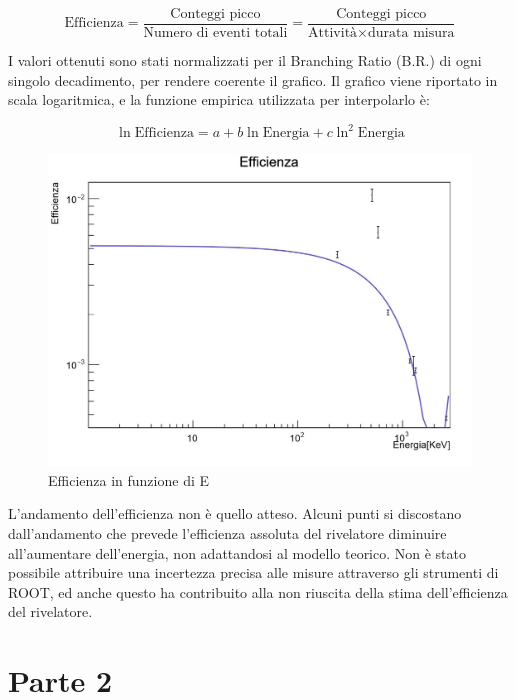 \documentclass[a4paper,10pt]{article}
\begin{document}
\begin{equation}
	\textrm{Efficienza}=\frac{\textrm{Conteggi picco}}{\textrm{Numero di eventi totali}}=\frac{\textrm{Conteggi picco}}{\textrm{Attivit\`a} \times \textrm{durata misura}}
\end{equation}

\noindent I valori ottenuti sono stati normalizzati per il Branching Ratio (B.R.) di ogni singolo decadimento, per rendere coerente il grafico. Il grafico viene riportato in scala logaritmica, e la funzione empirica utilizzata per interpolarlo \`e:

\begin{equation}
	\ln{\textrm{Efficienza}}=a + b\ln{\textrm{Energia}} + c\ln^{2}{\textrm{Energia}}
\end{equation}

\begin{figure}[H]
    \centering
    \includegraphics[scale=0.45]{grafici/efficienzasources}
    \caption{Efficienza in funzione di E}
\end{figure}

\noindent L'andamento dell'efficienza non \`e quello atteso. Alcuni punti si discostano dall'andamento che prevede l'efficienza assoluta del rivelatore diminuire all'aumentare dell'energia, non adattandosi al modello teorico. Non \`e stato possibile attribuire una incertezza precisa alle misure attraverso gli strumenti di ROOT, ed anche questo ha contribuito alla non riuscita della stima dell'efficienza del rivelatore.

\section{Parte 2}
\end{document}
